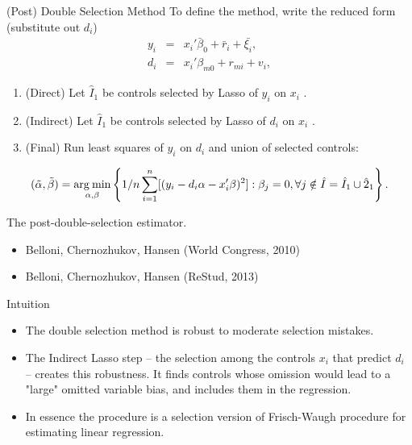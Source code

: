 \documentclass{beamer}
\newcommand{\argmin}{\operatornamewithlimits{arg\:min}}
\begin{document}
\begin{frame}{(Post) Double Selection Method}
To define the method, write the reduced form (substitute out $d_i$)
\begin{eqnarray}
y_i &=& x_i' \bar{\beta}_0 + \bar{r}_i + \bar{\xi_i},\\
d_i &=&  x_i' \beta_{m0} + r_{mi} + v_i, 
\end{eqnarray}

\begin{enumerate}
\item (Direct) Let $\hat{I}_1$ be controls selected by Lasso of $y_i$ on $x_i$ .
\item (Indirect) Let $\hat{I}_1$ be controls selected by Lasso of $d_i$ on $x_i$ .
\item (Final) Run least squares of $y_i$ on $d_i$ and union of selected controls:
\end{enumerate}
\[ (\tilde{\alpha}, \tilde{\beta}) = \argmin_{\alpha, \beta} \left\{ 1/n \sum_{i=1}^n [(y_i - d_i \alpha - x_i' \beta)^2]: \beta_j=0, \forall j \notin \hat{I}=\hat{I}_1 \cup \hat{2}_1  \right\}. \] 

The post-double-selection estimator.
\begin{itemize}
	\item Belloni, Chernozhukov, Hansen (World Congress, 2010)
	\item Belloni, Chernozhukov, Hansen (ReStud, 2013)
\end{itemize}
\end{frame}

\begin{frame}{Intuition}
	\begin{itemize}
		\item The double selection method is robust to moderate selection
mistakes.
\item The Indirect Lasso step -- the selection among the controls $x_i$
that predict $d_i$ -- creates this robustness. It finds controls whose
omission would lead to a "large" omitted variable bias, and
includes them in the regression.
\item In essence the procedure is a selection version of Frisch-Waugh
procedure for estimating linear regression.
	\end{itemize}
\end{frame}
\end{document}
